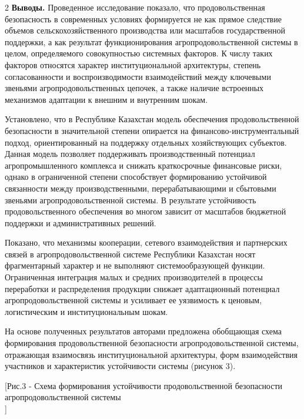\begin{multicols}{2}
{\bfseries Выводы.} Проведенное исследование показало, что
продовольственная безопасность в современных условиях формируется не как
прямое следствие объемов сельскохозяйственного производства или
масштабов государственной поддержки, а как результат функционирования
агропродовольственной системы в целом, определяемого совокупностью
системных факторов. К числу таких факторов относятся характер
институциональной архитектуры, степень согласованности и
воспроизводимости взаимодействий между ключевыми звеньями
агропродовольственных цепочек, а также наличие встроенных механизмов
адаптации к внешним и внутренним шокам.

Установлено, что в Республике Казахстан модель обеспечения
продовольственной безопасности в значительной степени опирается на
финансово-инструментальный подход, ориентированный на поддержку
отдельных хозяйствующих субъектов. Данная модель позволяет поддерживать
производственный потенциал агропромышленного комплекса и снижать
краткосрочные финансовые риски, однако в ограниченной степени
способствует формированию устойчивой связанности между
производственными, перерабатывающими и сбытовыми звеньями
агропродовольственной системы. В результате устойчивость
продовольственного обеспечения во многом зависит от масштабов бюджетной
поддержки и административных решений.

Показано, что механизмы кооперации, сетевого взаимодействия и
партнерских связей в агропродовольственной системе Республики Казахстан
носят фрагментарный характер и не выполняют системообразующей функции.
Ограниченная интеграция малых и средних производителей в процессы
переработки и распределения продукции снижает адаптационный потенциал
агропродовольственной системы и усиливает ее уязвимость к ценовым,
логистическим и институциональным шокам.

На основе полученных результатов авторами предложена обобщающая схема
формирования продовольственной безопасности агропродовольственной
системы, отражающая взаимосвязь институциональной архитектуры, форм
взаимодействия участников и характеристик устойчивости системы (рисунок
3).
\end{multicols}

[Рис.3 - Схема формирования устойчивости
продовольственной безопасности агропродовольственной
системы\\]

